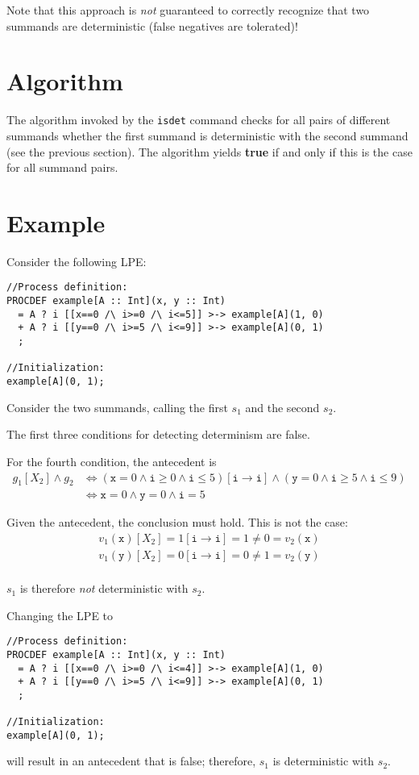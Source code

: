 Note that this approach is \emph{not} guaranteed to correctly recognize that two summands are deterministic (false negatives are tolerated)!

\section{Algorithm}

The algorithm invoked by the \texttt{isdet} command checks for all pairs of different summands whether the first summand is deterministic with the second summand (see the previous section).
The algorithm yields \textbf{true} if and only if this is the case for all summand pairs.

\section{Example}

Consider the following LPE:

\begin{lstlisting}
//Process definition:
PROCDEF example[A :: Int](x, y :: Int)
  = A ? i [[x==0 /\ i>=0 /\ i<=5]] >-> example[A](1, 0)
  + A ? i [[y==0 /\ i>=5 /\ i<=9]] >-> example[A](0, 1)
  ;

//Initialization:
example[A](0, 1);
\end{lstlisting}

Consider the two summands, calling the first $s_1$ and the second $s_2$.

The first three conditions for detecting determinism are false.

For the fourth condition, the antecedent is
\begin{align*}
g_1[X_2] \land g_2 &\Leftrightarrow (\texttt{x} = 0 \land \texttt{i} \geq 0 \land \texttt{i} \leq 5)[\texttt{i} \rightarrow \texttt{i}] \land (\texttt{y} = 0 \land \texttt{i} \geq 5 \land \texttt{i} \leq 9) \\
&\Leftrightarrow \texttt{x} = 0 \land \texttt{y} = 0 \land \texttt{i} = 5
\end{align*}

Given the antecedent, the conclusion must hold.
This is not the case:
\begin{align*}
v_1(\texttt{x})[X_2] = 1[\texttt{i} \rightarrow \texttt{i}] = 1 \neq 0 = v_2(\texttt{x}) \\
v_1(\texttt{y})[X_2] = 0[\texttt{i} \rightarrow \texttt{i}] = 0 \neq 1 = v_2(\texttt{y}) \\
\end{align*}

$s_1$ is therefore \emph{not} deterministic with $s_2$.

Changing the LPE to

\begin{lstlisting}
//Process definition:
PROCDEF example[A :: Int](x, y :: Int)
  = A ? i [[x==0 /\ i>=0 /\ i<=4]] >-> example[A](1, 0)
  + A ? i [[y==0 /\ i>=5 /\ i<=9]] >-> example[A](0, 1)
  ;

//Initialization:
example[A](0, 1);
\end{lstlisting}

will result in an antecedent that is false; therefore, $s_1$ is deterministic with $s_2$.

